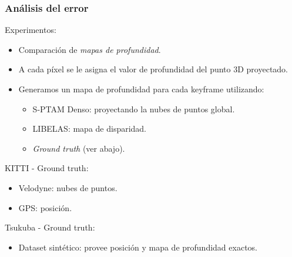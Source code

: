 \documentclass[compress]{beamer}
\begin{document}
\begin{frame}
	\frametitle{Análisis del error}
	
	\vspace{-1em}
	Experimentos:
	\begin{itemize}
		\item Comparación de \emph{mapas de profundidad}.
		\item A cada píxel se le asigna el valor de profundidad del punto 3D proyectado.
		\item Generamos un mapa de profundidad para cada keyframe utilizando:
		\begin{itemize}
			\item S-PTAM Denso: proyectando la nubes de puntos global.
			\item LIBELAS: mapa de disparidad.
			\item \emph{Ground truth} (ver abajo).
		\end{itemize}
	\end{itemize}

	\vspace{1em}
	\pause{}	
	KITTI - Ground truth:
	\begin{itemize}
		\item Velodyne: nubes de puntos.
		\item GPS: posición.
	\end{itemize}
	
	\vspace{1em}
	Tsukuba - Ground truth:
	\begin{itemize}
		\item Dataset sintético: provee posición y mapa de profundidad exactos.
	\end{itemize}
	
\end{frame}
\end{document}
